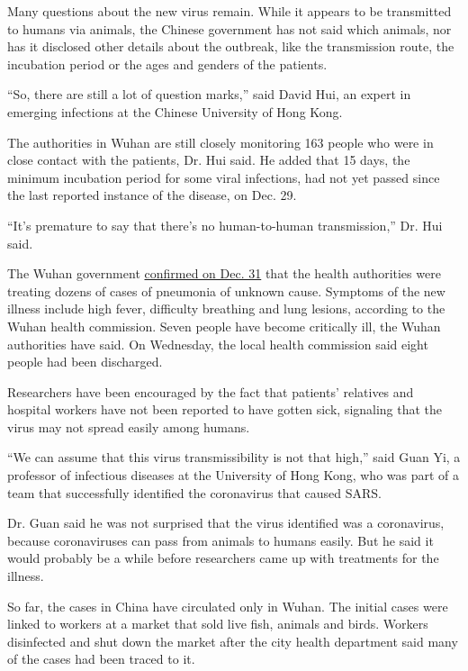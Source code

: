 Many questions about the new virus remain. While it appears to be
transmitted to humans via animals, the Chinese government has not said
which animals, nor has it disclosed other details about the outbreak,
like the transmission route, the incubation period or the ages and
genders of the patients.

``So, there are still a lot of question marks,'' said David Hui, an
expert in emerging infections at the Chinese University of Hong Kong.

The authorities in Wuhan are still closely monitoring 163 people who
were in close contact with the patients, Dr. Hui said. He added that 15
days, the minimum incubation period for some viral infections, had not
yet passed since the last reported instance of the disease, on Dec. 29.

``It's premature to say that there's no human-to-human transmission,''
Dr. Hui said.

The Wuhan government
\href{http://wjw.wuhan.gov.cn/front/web/showDetail/2019123108989}{confirmed
on Dec. 31} that the health authorities were treating dozens of cases of
pneumonia of unknown cause. Symptoms of the new illness include high
fever, difficulty breathing and lung lesions, according to the Wuhan
health commission. Seven people have become critically ill, the Wuhan
authorities have said. On Wednesday, the local health commission said
eight people had been discharged.

Researchers have been encouraged by the fact that patients' relatives
and hospital workers have not been reported to have gotten sick,
signaling that the virus may not spread easily among humans.

``We can assume that this virus transmissibility is not that high,''
said Guan Yi, a professor of infectious diseases at the University of
Hong Kong, who was part of a team that successfully identified the
coronavirus that caused SARS.

Dr. Guan said he was not surprised that the virus identified was a
coronavirus, because coronaviruses can pass from animals to humans
easily. But he said it would probably be a while before researchers came
up with treatments for the illness.

So far, the cases in China have circulated only in Wuhan. The initial
cases were linked to workers at a market that sold live fish, animals
and birds. Workers disinfected and shut down the market after the city
health department said many of the cases had been traced to it.

